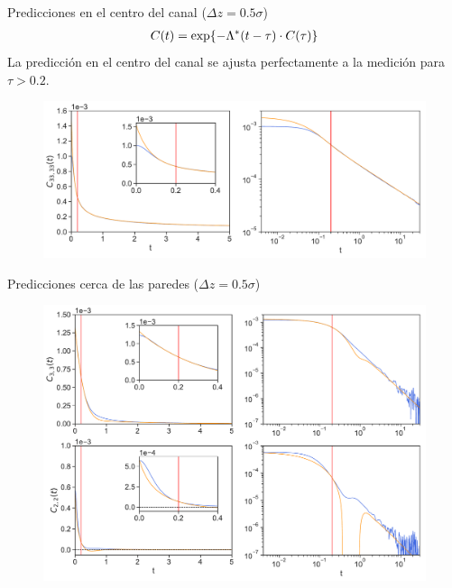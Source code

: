 \documentclass{beamer}
\begin{document}
\begin{frame}{Predicciones en el centro del canal ($\Delta z=0.5\sigma$)}
  \begin{align}
    C(t) = {\rm exp}\{-\Lambda^*(t-\tau)\cdot C(\tau)\}
    \nonumber
  \end{align}
La {\color{orange} predicción} en el centro del canal se ajusta perfectamente  a la {\color{blue} medición} para $\tau>0.2$.
  
\begin{figure}[h!]
\includegraphics[width=\linewidth]{Predictions-canal-WALLS-66nodes-defense}
\end{figure}
\end{frame}

\begin{frame}{Predicciones cerca de las paredes ($\Delta z=0.5\sigma$)}
\begin{figure}[h!]
\includegraphics[width=\linewidth]{Predictions-WALLS-66nodes-defense}
\end{figure}
\end{frame}
\end{document}
